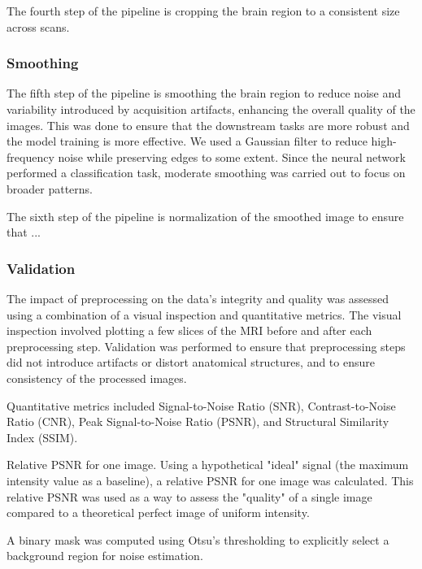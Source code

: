 The fourth step of the pipeline is cropping the brain region to a consistent size across scans.

\subsubsection{Smoothing}

The fifth step of the pipeline is smoothing the brain region to reduce noise and variability introduced by acquisition artifacts, enhancing the overall quality of the images. This was done to ensure that the downstream tasks are more robust and the model training is more effective. We used a Gaussian filter to reduce high-frequency noise while preserving edges to some extent. Since the neural network performed a classification task, moderate smoothing was carried out to focus on broader patterns.

The sixth step of the pipeline is normalization of the smoothed image to ensure that ...

\subsubsection{Validation}

The impact of preprocessing on the data's integrity and quality was assessed using a combination of a visual inspection and quantitative metrics. The visual inspection involved plotting a few slices of the MRI before and after each preprocessing step. Validation was performed to ensure that preprocessing steps did not introduce artifacts or distort anatomical structures, and to ensure consistency of the processed images.

Quantitative metrics included Signal-to-Noise Ratio (SNR), Contrast-to-Noise Ratio (CNR), Peak Signal-to-Noise Ratio (PSNR), and 
Structural Similarity Index (SSIM). 

Relative PSNR for one image. Using a hypothetical "ideal" signal (the maximum intensity value as a baseline), a relative PSNR for one image was calculated. This relative PSNR was used as a way to assess the "quality" of a single image compared to a theoretical perfect image of uniform intensity.

A binary mask was computed using Otsu's thresholding to explicitly select a background region for noise estimation.

